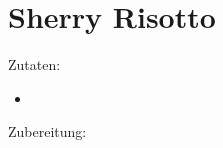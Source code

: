 \section{Sherry Risotto}
Zutaten:
\begin{itemize}
    \item
\end{itemize}

Zubereitung:

\newpage
\mbox{}
\vfill
\begin{center}
\end{center}
\vfill
\mbox{ }
\newpage
